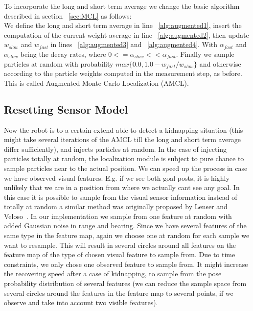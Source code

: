 \documentclass[	DIV=calc,%
							paper=a4,%
							fontsize=9pt,%
							twocolumn]{scrartcl}	 					%
\begin{document}
To incorporate the long and short term average we change the basic algorithm described in section ~\ref{sec:MCL} as follows:\\
We define the long and short term average in line ~\ref{alg:augmented1}, insert the computation of the current weight average in line ~\ref{alg:augmented2}, then update $w_{slow}$ and $w_{fast}$ in lines ~\ref{alg:augmented3} and ~\ref{alg:augmented4}. With $\alpha_{fast}$ and $\alpha_{slow}$ being the decay rates, where $0<=\alpha_{slow}<<\alpha_{fast}$. Finally we sample particles at random with probability $max\{0.0,1.0-w_{fast}/w_{slow}\}$ and otherwise according to the particle weights computed in the measurement step, as before.
This is called Augmented Monte Carlo Localization (AMCL).
\subsection{Resetting Sensor Model}
\label{sec:Reset}
Now the robot is to a certain extend able to detect a kidnapping situation (this might take several iterations of the AMCL till the long and short term average differ sufficiently), and injects particles at random. 
In the case of injecting particles totally at random, the localization module is subject to pure chance to sample particles near to the actual position. We can speed up the process in case we have observed visual features. E.g. if we see both goal posts, it is highly unlikely that we are in a position from where we actually cant see any goal.
In this case it is possible to sample from the visual sensor information instead of totally at random a similar method  was originally proposed by Lenser and Veloso~\cite{lenser2000sensor}. In our implementation we sample from one feature at random with added Gaussian noise in range and bearing. Since we have several features of the same type in the feature map, again we choose one at random for each sample we want to resample. This will result in several circles around all features on the feature map of the type of chosen visual feature to sample from. Due to time constraints, we only chose one observed feature to sample from.
It might increase the recovering speed after a case of kidnapping, to sample from the pose probability distribution of several features (we can reduce the sample space from several circles around the features in the feature map to several points, if we observe and take into account two visible features).
\end{document}
